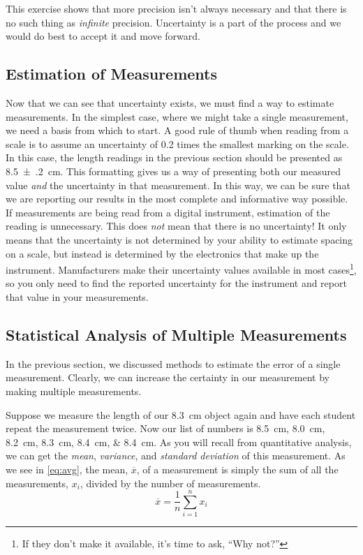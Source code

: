 This exercise shows that more precision isn't always necessary and that there is no such thing as \emph{infinite} precision. 
Uncertainty is a part of the process and we would do best to accept it and move forward. 


\subsection{Estimation of Measurements} %
\label{sub:estimation_of_measurements}

Now that we can see that uncertainty exists, we must find a way to estimate measurements. 
In the simplest case, where we might take a single measurement, we need a basis from which to start. 
A good rule of thumb when reading from a scale is to assume an uncertainty of \num{0.2} times the smallest marking on the scale. 
In this case, the length readings in the previous section should be presented as \qty{8.5(2)}{\cm}. 
This formatting gives us a way of presenting both our measured value \emph{and} the uncertainty in that measurement. 
In this way, we can be sure that we are reporting our results in the most complete and informative way possible. 
If measurements are being read from a digital instrument, estimation of the reading is unnecessary. 
This does \emph{not} mean that there is no uncertainty! 
It only means that the uncertainty is not determined by your ability to estimate spacing on a scale, but instead is determined by the electronics that make up the instrument. 
Manufacturers make their uncertainty values available in most cases\footnote{If they don't make it available, it's time to ask, ``Why not?''}, so you only need to find the reported uncertainty for the instrument and report that value in your measurements. 


\subsection{Statistical Analysis of Multiple Measurements} %
\label{sub:statistical_analysis_of_multiple_measurements}

In the previous section, we discussed methods to estimate the error of a single measurement. 
Clearly, we can increase the certainty in our measurement by making multiple measurements. 

Suppose we measure the length of our \qty{8.3}{\cm} object again and have each student repeat the measurement twice. 
Now our list of numbers is \SIlist{8.5;8.0;8.2;8.3;8.4;8.4}{\cm}. 
As you will recall from quantitative analysis, we can get the \emph{mean}, \emph{variance}, and \emph{standard deviation} of this measurement. 
As we see in \cref{eq:avg}, the mean, \( \overline{x} \), of a measurement is simply the sum of all the measurements, \( x_i \), divided by the number of measurements.
\begin{equation}
	\overline{x} = \frac{1}{n}\sum_{i=1}^n{x_i}
	\label{eq:avg}
\end{equation}


